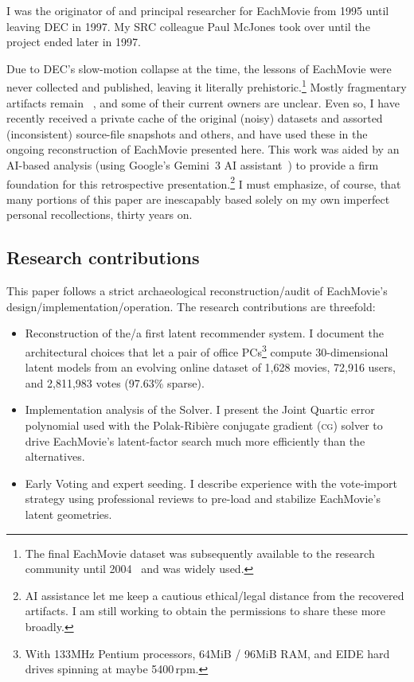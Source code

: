 \documentclass[sigconf,authorversion,screen,microtype={protrusion=true,expansion,kerning,spacing}]{acmart}
\begin{document}
I was the originator of and principal researcher for EachMovie from 1995 until leaving DEC in 1997. My SRC colleague Paul McJones took over until the project ended later in 1997.

Due to DEC's slow-motion collapse at the time, the lessons of EachMovie were never collected and published, leaving it literally prehistoric.\footnote{The final EachMovie dataset was subsequently available to the research community until 2004~\cite{HPLabs2004} and was widely used.} Mostly fragmentary artifacts remain~\cite{DeTrevillePatent2000} \cite{McJones97}, and some of their current owners are unclear. Even so, I have recently received a private cache of the original (noisy) datasets and assorted (inconsistent) source-file snapshots and others, and have used these in the ongoing reconstruction of EachMovie presented here. This work was aided by an AI-based analysis (using Google's Gemini~3 AI assistant~\cite{gemini2026}) to provide a firm foundation for this retrospective presentation.\footnote{AI assistance let me keep a cautious ethical/\allowbreak{}legal distance from the recovered artifacts. I am still working to obtain the permissions to share these more broadly.} I must emphasize, of course, that many portions of this paper are inescapably based solely on my own imperfect personal recollections, thirty years on.

\subsection{Research contributions}

This paper follows a strict archaeological reconstruction/\allowbreak{}audit of EachMovie's design/\allowbreak{}implementation/\allowbreak{}operation. The research contributions are threefold:

\begin{itemize}

    \item Reconstruction of the/a first latent recommender system. I document the architectural choices that let a pair of office PCs\footnote{With 133\;MHz Pentium processors, 64\;MiB / 96\;MiB RAM, and EIDE hard drives spinning at maybe 5400\,rpm.} compute 30-dimensional latent models from an evolving online dataset of 1,628 movies, 72,916 users, and 2,811,983 votes (97.63\% sparse).

    \item Implementation analysis of the Solver. I present the Joint Quartic error polynomial used with the Polak-Ribi\`ere con\-ju\-gate gradient (\textsc{cg}) solver to drive EachMovie's latent-factor search much more efficiently than the alternatives.

    \item Early Voting and expert seeding. I describe experience with the vote-import strategy using professional reviews to pre-load and stabilize EachMovie's latent geometries.

\end{itemize}
\end{document}
